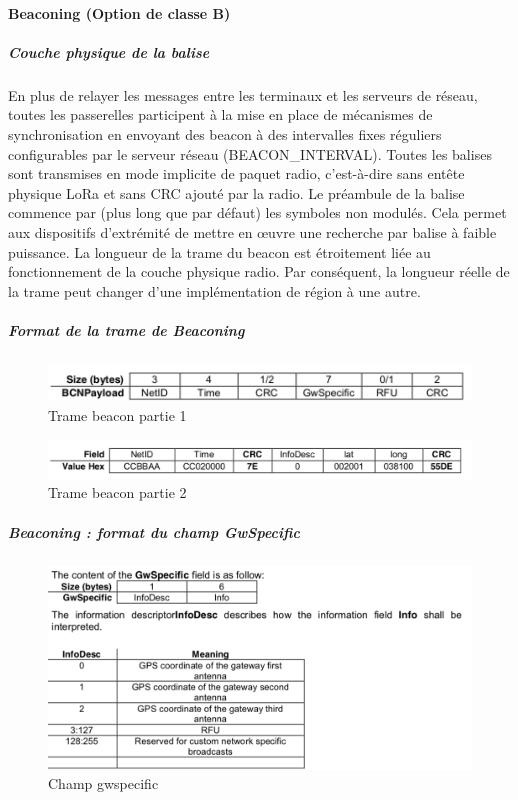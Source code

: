 \documentclass[11pt]{article}
\begin{document}
\paragraph{Beaconing (Option de classe B)}
\subparagraph{ Couche physique de la balise}
En plus de relayer les messages entre les terminaux et les serveurs de réseau, toutes les passerelles participent à la mise en place de mécanismes de synchronisation en envoyant des beacon à des intervalles fixes réguliers configurables par le serveur réseau (BEACON\_INTERVAL). Toutes les balises sont transmises en mode implicite de paquet radio, c'est-à-dire sans entête physique LoRa et sans CRC ajouté par la radio. Le préambule de la balise commence par (plus long que par défaut) les symboles non modulés. Cela permet aux dispositifs d'extrémité de mettre en œuvre une recherche par balise à faible puissance. La longueur de la trame du beacon est étroitement liée au fonctionnement de la couche physique radio. Par conséquent, la longueur réelle de la trame peut changer d'une implémentation de région à une autre.

\subparagraph{Format de la trame de Beaconing}

\begin{figure}[h!]
\centering
\includegraphics[scale=0.6]{beacon_frame_1.png}
\caption{Trame beacon partie 1}
\end{figure}

\begin{figure}[h!]
\centering
\includegraphics[scale=0.6]{beacon_frame_2.png}
\caption{Trame beacon partie 2}
\end{figure}

\subparagraph{Beaconing : format du champ GwSpecific }

\begin{figure}[h!]
\centering
\includegraphics[scale=0.6]{beacon_gwspecific.png} 
\caption{Champ gwspecific}
\end{figure}
\end{document}
